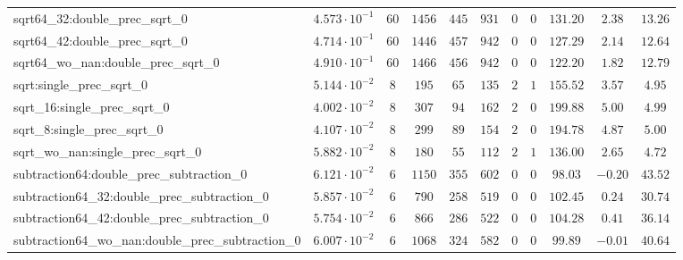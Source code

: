 \begin{tabular}{|l|c|c|c|c|c|c|c|c|c|c|}
sqrt64\_32:double\_prec\_sqrt\_0                          & $ 4.573 \cdot 10^{-1} $ & $ 60     $ & $ 1456   $ & $ 445   $ & $ 931   $ & $ 0   $ & $ 0 $ & $ 131.20      $ & $ 2.38    $ & $ 13.26   $ \\
sqrt64\_42:double\_prec\_sqrt\_0                          & $ 4.714 \cdot 10^{-1} $ & $ 60     $ & $ 1446   $ & $ 457   $ & $ 942   $ & $ 0   $ & $ 0 $ & $ 127.29      $ & $ 2.14    $ & $ 12.64   $ \\
sqrt64\_wo\_nan:double\_prec\_sqrt\_0                     & $ 4.910 \cdot 10^{-1} $ & $ 60     $ & $ 1466   $ & $ 456   $ & $ 942   $ & $ 0   $ & $ 0 $ & $ 122.20      $ & $ 1.82    $ & $ 12.79   $ \\
sqrt:single\_prec\_sqrt\_0                                & $ 5.144 \cdot 10^{-2} $ & $ 8      $ & $ 195    $ & $ 65    $ & $ 135   $ & $ 2   $ & $ 1 $ & $ 155.52      $ & $ 3.57    $ & $ 4.95    $ \\
sqrt\_16:single\_prec\_sqrt\_0                            & $ 4.002 \cdot 10^{-2} $ & $ 8      $ & $ 307    $ & $ 94    $ & $ 162   $ & $ 2   $ & $ 0 $ & $ 199.88      $ & $ 5.00    $ & $ 4.99    $ \\
sqrt\_8:single\_prec\_sqrt\_0                             & $ 4.107 \cdot 10^{-2} $ & $ 8      $ & $ 299    $ & $ 89    $ & $ 154   $ & $ 2   $ & $ 0 $ & $ 194.78      $ & $ 4.87    $ & $ 5.00    $ \\
sqrt\_wo\_nan:single\_prec\_sqrt\_0                       & $ 5.882 \cdot 10^{-2} $ & $ 8      $ & $ 180    $ & $ 55    $ & $ 112   $ & $ 2   $ & $ 1 $ & $ 136.00      $ & $ 2.65    $ & $ 4.72    $ \\
subtraction64:double\_prec\_subtraction\_0                & $ 6.121 \cdot 10^{-2} $ & $ 6      $ & $ 1150   $ & $ 355   $ & $ 602   $ & $ 0   $ & $ 0 $ & $ 98.03       $ & $ -0.20   $ & $ 43.52   $ \\
subtraction64\_32:double\_prec\_subtraction\_0            & $ 5.857 \cdot 10^{-2} $ & $ 6      $ & $ 790    $ & $ 258   $ & $ 519   $ & $ 0   $ & $ 0 $ & $ 102.45      $ & $ 0.24    $ & $ 30.74   $ \\
subtraction64\_42:double\_prec\_subtraction\_0            & $ 5.754 \cdot 10^{-2} $ & $ 6      $ & $ 866    $ & $ 286   $ & $ 522   $ & $ 0   $ & $ 0 $ & $ 104.28      $ & $ 0.41    $ & $ 36.14   $ \\
subtraction64\_wo\_nan:double\_prec\_subtraction\_0       & $ 6.007 \cdot 10^{-2} $ & $ 6      $ & $ 1068   $ & $ 324   $ & $ 582   $ & $ 0   $ & $ 0 $ & $ 99.89       $ & $ -0.01   $ & $ 40.64   $ \\

\end{tabular}
